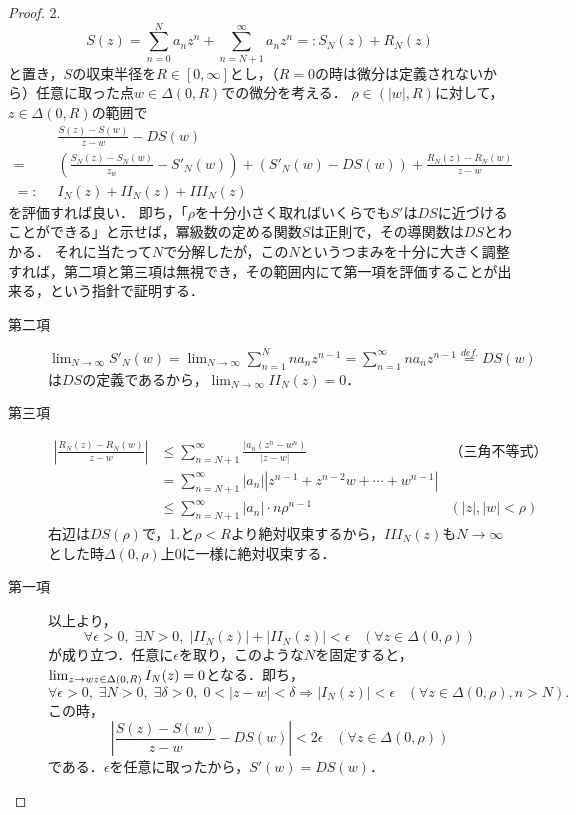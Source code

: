 \documentclass[uplatex, dvipdfmx]{jsreport}
\begin{document}
\begin{proof}
    2. \[S(z)=\sum^N_{n=0}a_nz^n+\sum^\infty_{n=N+1}a_nz^n=:S_N(z)+R_N(z)\]
    と置き，$S$の収束半径を$R\in[0,\infty]$とし，（$R=0$の時は微分は定義されないから）任意に取った点$w\in\Delta(0,R)$での微分を考える．
    $\rho\in(|w|,R)$に対して，$z\in\Delta(0,R)$の範囲で
    \begin{align*}
        &\frac{S(z)-S(w)}{z-w}-DS(w)\\
        =\;\;&\left( \frac{S_N(z)-S_N(w)}{z_w}-S'_N(w) \right) + \left( S'_N(w)-DS(w) \right) + \frac{R_N(z)-R_N(w)}{z-w}\\
        =:\;\;&I_N(z) + II_N(z) + III_N(z)
    \end{align*}
    を評価すれば良い．
    即ち，「$\rho$を十分小さく取ればいくらでも$S'$は$DS$に近づけることができる」と示せば，冪級数の定める関数$S$は正則で，その導関数は$DS$とわかる．
    それに当たって$N$で分解したが，この$N$というつまみを十分に大きく調整すれば，第二項と第三項は無視でき，その範囲内にて第一項を評価することが出来る，という指針で証明する．
    \begin{description}
        \item[第二項] $\lim_{N\to\infty}S'_N(w)=\lim_{N\to\infty}\sum^N_{n=1}na_nz^{n-1}=\sum^\infty_{n=1}na_nz^{n-1}\overset{def.}{=}DS(w)$は$DS$の定義であるから，$\lim_{N\to\infty}II_N(z)=0$．
        \item[第三項] \begin{align*}
            \left|\frac{R_N(z)-R_N(w)}{z-w}\right| &\le \sum^\infty_{n=N+1}\frac{|a_n(z^n-w^n)}{|z-w|}&（三角不等式）\\
            &= \sum^\infty_{n=N+1}|a_n||z^{n-1}+z^{n-2}w+\cdots+w^{n-1}|\\
            &\le \sum^\infty_{n=N+1}|a_n|\cdot n\rho^{n-1}&(|z|,|w|<\rho)
        \end{align*}
        右辺は$DS(\rho)$で，1.と$\rho<R$より絶対収束するから，$III_N(z)$も$N\to\infty$とした時$\Delta(0,\rho)$上$0$に一様に絶対収束する．
        \item[第一項] 以上より，
        \[ \forall\epsilon>0,\;\exists N>0,\;|II_N(z)|+|II_N(z)|<\epsilon\;\;\;(\forall z\in\Delta(0,\rho)) \]
        が成り立つ．任意に$\epsilon$を取り，このような$N$を固定すると，$\lim_{z\to w\\z\in\Delta(0,R)}I_N(z)=0$となる．即ち，
        \[ \forall\epsilon>0,\;\exists N>0,\;\exists \delta>0,\;0<|z-w|<\delta\Rightarrow |I_N(z)|<\epsilon\;\;\;(\forall z\in\Delta(0,\rho), n>N). \]
        この時，
        \[ \left|\frac{S(z)-S(w)}{z-w}-DS(w)\right|<2\epsilon\;\;\;(\forall z\in\Delta(0,\rho)) \]
        である．$\epsilon$を任意に取ったから，$S'(w)=DS(w)$．
    \end{description}
\end{proof}
\end{document}
